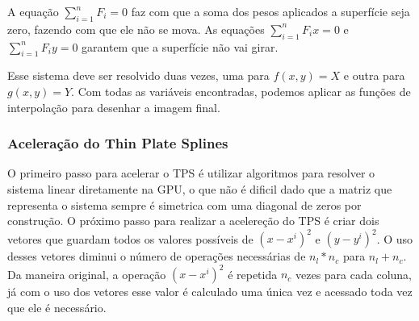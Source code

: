 A equação $\sum_{i=1}^n F_i = 0$ faz com que a soma dos pesos aplicados a superfície seja zero, fazendo com que
ele não se mova. As equações $\sum_{i=1}^n F_ix = 0$ e $\sum_{i=1}^n F_iy = 0$ garantem que a superfície não vai girar.

    Esse sistema deve ser resolvido duas vezes, uma para $f(x,y) = X$ e outra para $g(x,y) = Y$. Com todas as variáveis
encontradas, podemos aplicar as funções de interpolação para desenhar a imagem final.

\subsubsection{Aceleração do Thin Plate Splines}

    O primeiro passo para acelerar o TPS é utilizar algoritmos para resolver o sistema linear diretamente na GPU, o que
não é dificil dado que a matriz que representa o sistema sempre é simetrica com uma diagonal de zeros por construção. O
próximo passo para realizar a acelereção do TPS é criar dois vetores que guardam todos os valores possíveis de $(x-x^i)^2$
e $(y-y^i)^2$. O uso desses vetores diminui o número de operações necessárias de $n_l*n_c$ para $n_l+n_c$. Da maneira
original, a operação $(x-x^i)^2$ é repetida $n_c$ vezes para cada coluna, já com o uso dos vetores esse valor é calculado
uma única vez e acessado toda vez que ele é necessário.

